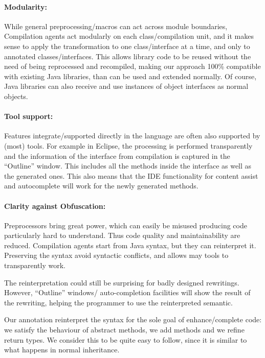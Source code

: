 \paragraph{Modularity:}
While general preprocessing/macros can act across module boundaries,
Compilation agents act modularly on each class/compilation unit, and it makes
sense to apply the transformation to one class/interface at a time, and only to annotated classes/interfaces.
This allows library code to be reused without the need of being
reprocessed and recompiled, making our approach 100\% compatible with existing Java libraries, than can be used
and extended normally. Of course, Java libraries can also receive and use instances of object interfaces as normal objects.

\paragraph{Tool support:}
Features integrate/supported directly in the language are often also supported by (most) tools.
For example in Eclipse, the processing is performed transparently and the information of
the interface from compilation is captured in the ``Outline'' window. This includes
all the methods inside the interface as well as the generated ones.
This also means that the IDE functionality for content assist and autocomplete
will work for the newly generated methods.


\paragraph{Clarity against Obfuscation:}
Preprocessors bring great power, which can easily be misused producing
code particularly hard to understand. Thus code quality and maintainability are reduced.
Compilation agents start from Java syntax, but they can reinterpret it.
Preserving the syntax avoid syntactic conflicts, and allows may tools to transparently work.

The reinterpretation could still be surprising for badly designed rewritings.
However, ``Outline'' windows/ auto-completion facilities
will show the result of the rewriting, helping the programmer to use the reinterpreted semantic.

Our annotation reinterpret the syntax for the sole goal of enhance/complete code:
we satisfy the behaviour of abstract methods, we add methods and we refine return types.
We consider this to be quite easy to follow, since it is similar to what happens in normal inheritance.

